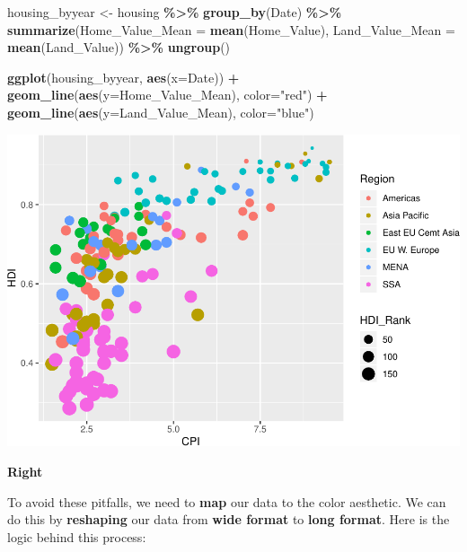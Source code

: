 \documentclass[
]{book}
\newenvironment{Shaded}{\begin{snugshade}}{\end{snugshade}}
\newcommand{\DataTypeTok}[1]{\textcolor[rgb]{0.13,0.29,0.53}{#1}}
\newcommand{\KeywordTok}[1]{\textcolor[rgb]{0.13,0.29,0.53}{\textbf{#1}}}
\newcommand{\NormalTok}[1]{#1}
\newcommand{\OperatorTok}[1]{\textcolor[rgb]{0.81,0.36,0.00}{\textbf{#1}}}
\newcommand{\StringTok}[1]{\textcolor[rgb]{0.31,0.60,0.02}{#1}}
\begin{document}
\begin{Shaded}
\begin{Highlighting}[]
\NormalTok{housing\_byyear \textless{}{-}}\StringTok{ }
\StringTok{  }\NormalTok{housing }\OperatorTok{\%\textgreater{}\%}
\StringTok{  }\KeywordTok{group\_by}\NormalTok{(Date) }\OperatorTok{\%\textgreater{}\%}
\StringTok{  }\KeywordTok{summarize}\NormalTok{(}\DataTypeTok{Home\_Value\_Mean =} \KeywordTok{mean}\NormalTok{(Home\_Value),}
            \DataTypeTok{Land\_Value\_Mean =} \KeywordTok{mean}\NormalTok{(Land\_Value)) }\OperatorTok{\%\textgreater{}\%}
\StringTok{  }\KeywordTok{ungroup}\NormalTok{()}

\KeywordTok{ggplot}\NormalTok{(housing\_byyear, }\KeywordTok{aes}\NormalTok{(}\DataTypeTok{x=}\NormalTok{Date)) }\OperatorTok{+}
\StringTok{  }\KeywordTok{geom\_line}\NormalTok{(}\KeywordTok{aes}\NormalTok{(}\DataTypeTok{y=}\NormalTok{Home\_Value\_Mean), }\DataTypeTok{color=}\StringTok{"red"}\NormalTok{) }\OperatorTok{+}
\StringTok{  }\KeywordTok{geom\_line}\NormalTok{(}\KeywordTok{aes}\NormalTok{(}\DataTypeTok{y=}\NormalTok{Land\_Value\_Mean), }\DataTypeTok{color=}\StringTok{"blue"}\NormalTok{)}
\end{Highlighting}
\end{Shaded}

\includegraphics{R/Rgraphics/figures/unnamed-chunk-201-1.pdf}

\textbf{Right}

To avoid these pitfalls, we need to \textbf{map} our data to the color aesthetic.
We can do this by \textbf{reshaping} our data from \textbf{wide format} to \textbf{long format}.
Here is the logic behind this process:
\end{document}
